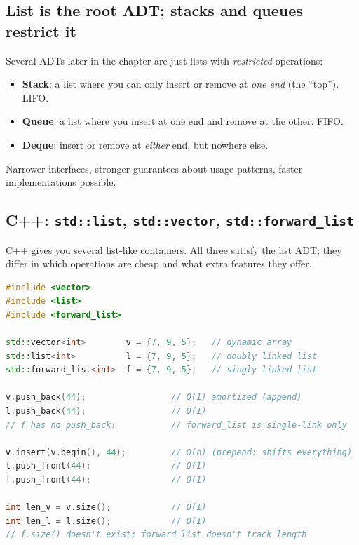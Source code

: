 \documentclass[11pt]{article}
\begin{document}
\subsection{List is the root ADT; stacks and queues restrict it}

\begin{defnbox}
Several ADTs later in the chapter are just lists with
\emph{restricted} operations:
\begin{itemize}[leftmargin=*]
  \item \textbf{Stack}: a list where you can only insert or remove
        at \emph{one end} (the ``top''). LIFO.
  \item \textbf{Queue}: a list where you insert at one end and
        remove at the other. FIFO.
  \item \textbf{Deque}: insert or remove at \emph{either} end, but
        nowhere else.
\end{itemize}
Narrower interfaces, stronger guarantees about usage patterns,
faster implementations possible.
\end{defnbox}

\subsection{C++: \texttt{std::list}, \texttt{std::vector}, \texttt{std::forward\_list}}

C++ gives you several list-like containers. All three satisfy the
list ADT; they differ in which operations are cheap and what extra
features they offer.

\begin{examplebox}
\begin{lstlisting}[basicstyle=\ttfamily\small,frame=single,language=C++]
#include <vector>
#include <list>
#include <forward_list>

std::vector<int>        v = {7, 9, 5};   // dynamic array
std::list<int>          l = {7, 9, 5};   // doubly linked list
std::forward_list<int>  f = {7, 9, 5};   // singly linked list

v.push_back(44);                 // O(1) amortized (append)
l.push_back(44);                 // O(1)
// f has no push_back!           // forward_list is single-link only

v.insert(v.begin(), 44);         // O(n) (prepend: shifts everything)
l.push_front(44);                // O(1)
f.push_front(44);                // O(1)

int len_v = v.size();            // O(1)
int len_l = l.size();            // O(1)
// f.size() doesn't exist; forward_list doesn't track length
\end{lstlisting}
\end{examplebox}
\end{document}
